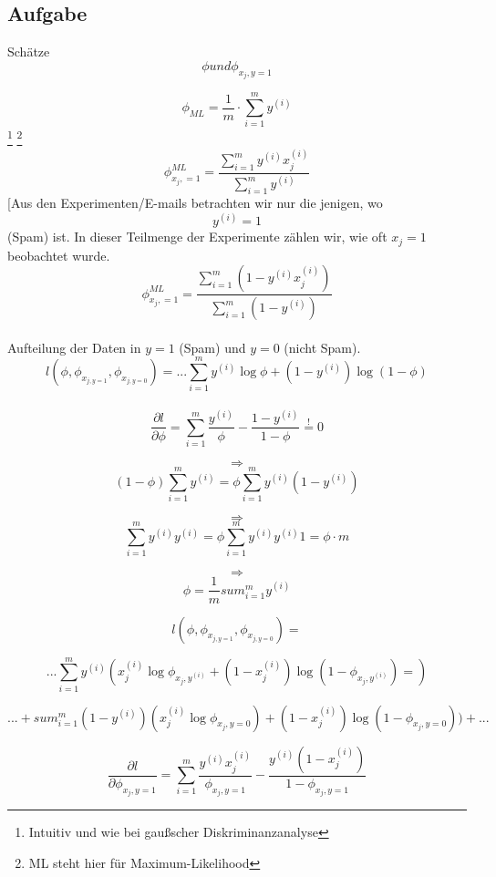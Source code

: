 \subsection{Aufgabe }

Schätze \[ \phi und \phi_{x_j,y=1} \]

\[ \phi_{ML} = \frac{1}{m} \cdot \sum_{i=1}^{m} y^{(i)} \]\footnote{Intuitiv und wie bei gaußscher Diskriminanzanalyse}
\footnote{ML steht hier für Maximum-Likelihood} \\

\[ \phi_{x_j,=1}^{ML} = \frac{\sum_{i=1}^{m} y^{(i)}x_{j}^{(i)} }{\sum_{i=1}^{m} y^{(i)}} \] [Aus den Experimenten/E-mails betrachten wir nur die jenigen, wo \[ y^{(i)} = 1 \] (Spam) ist. In dieser Teilmenge der Experimente zählen wir, wie oft $x_j = 1$ beobachtet wurde.\\

\[ \phi_{x_j,=1}^{ML} = \frac{ \sum_{i=1}^{m}( 1 - y^{(i)}x_{j}^{(i)} ) }{ \sum_{i=1}^{m}( 1 - y^{(i)} ) } \] \\
Aufteilung der Daten in $y=1$ (Spam) und $y=0$ (nicht Spam).\\

\[ l(\phi, \phi_{x_{j,y=1}},  \phi_{x_{j,y=0}}) = ...  \sum_{i=1}^{m} y^{(i)} \log\phi + (1 - y^{(i)}) \log(1 - \phi) \] \\

\[ \frac{\partial l}{\partial \phi} = \sum_{i=1}^{m} \frac{y^{(i)}}{\phi} - \frac{1 - y^{(i)}}{1 - \phi} \overset{!}{=} 0 \]

\[ \Rightarrow \] \[ (1 - \phi) \sum_{i=1}^{m} y^{(i)} = \phi \sum_{i=1}^{m} y^{(i)} (1 - y^{(i)}) \]

\[ \Rightarrow \] \[ \sum_{i=1}^{m} y^{(i)} y^{(i)} = \phi \sum_{i=1}^{m} y^{(i)} y^{(i)} 1 = \phi \cdot m \]

\[ \Rightarrow \] \[ \phi = \frac{1}{m} sum_{i=1}^{m} y^{(i)} \]

\[ l(\phi, \phi_{x_{j,y=1}}, \phi_{x_{j,y=0}}) = \] 

\[... \sum_{i=1}^{m} y^{(i)} (x_{j}^{(i)} \log \phi_{x_j,y^{(i)}} + (1 - x_j^{(i)}) \log (1 - \phi _{x_j, y^{(i)}}) = ) \]

\[ ... + sum_{i=1}^{m} (1 - y^{(i)}) (x_j^{(i)} \log \phi_{x_j,y=0}) + (1 - x_j^{(i)}) \log (1 - \phi_{x_j,y=0})) + ... \]

\[ \frac{\partial l}{\partial \phi_{x_j,y=1}} = \sum_{i=1}^{m} \frac{y^{(i)} x_j^{(i)}}{\phi_{x_j,y=1}} -  \frac{y^{(i)} (1 - x_j^{(i)})}{1 - \phi_{x_j,y=1}} \]

